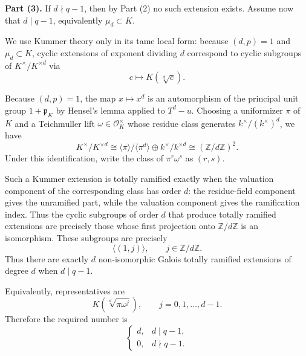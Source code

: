 \begin{solution}
\textbf{Part (3).}
If $d\nmid q-1$, then by Part (2) no such extension exists. Assume now that $d\mid q-1$, equivalently $\mu_d\subset K$.

We use Kummer theory only in its tame local form: because $(d,p)=1$ and $\mu_d\subset K$, cyclic extensions of exponent dividing $d$ correspond to cyclic subgroups of $K^\times/K^{\times d}$ via
\[
c\longmapsto K(\sqrt[d]{c}).
\]

Because $(d,p)=1$, the map $x\mapsto x^d$ is an automorphism of the principal unit group $1+\mathfrak p_K$ by Hensel's lemma applied to $T^d-u$. Choosing a uniformizer $\pi$ of $K$ and a Teichmuller lift $\omega\in \mathcal{O}_K^\times$ whose residue class generates $k^\times/(k^\times)^d$, we have
\[
K^\times/K^{\times d}
\cong
\langle \pi\rangle/\langle \pi^d\rangle
\oplus
k^\times/k^{\times d}
\cong
(\mathbb{Z}/d\mathbb{Z})^2.
\]
Under this identification, write the class of $\pi^r\omega^s$ as $(r,s)$.

Such a Kummer extension is totally ramified exactly when the valuation component of the corresponding class has order $d$: the residue-field component gives the unramified part, while the valuation component gives the ramification index. Thus the cyclic subgroups of order $d$ that produce totally ramified extensions are precisely those whose first projection onto $\mathbb{Z}/d\mathbb{Z}$ is an isomorphism. These subgroups are precisely
\[
\langle (1,j)\rangle,
\qquad
j\in \mathbb{Z}/d\mathbb{Z}.
\]
Thus there are exactly $d$ non-isomorphic Galois totally ramified extensions of degree $d$ when $d\mid q-1$.

Equivalently, representatives are
\[
K\left(\sqrt[d]{\pi\omega^j}\right),
\qquad
j=0,1,\ldots,d-1.
\]
Therefore the required number is
\[
\begin{cases}
d, & d\mid q-1,\\
0, & d\nmid q-1.
\end{cases}
\]
\end{solution}
